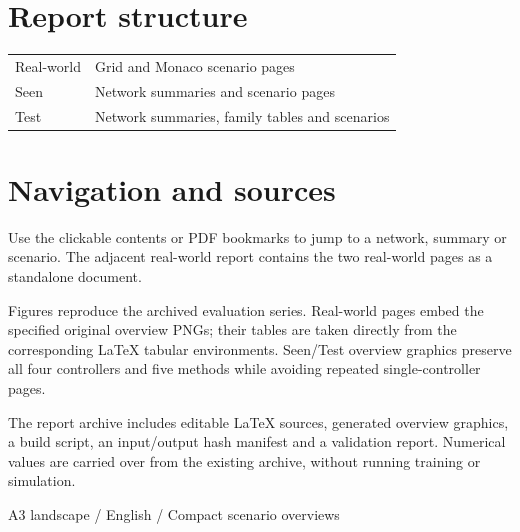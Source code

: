 \documentclass[11pt]{article}
\begin{document}
\begin{minipage}[t]{0.38\textwidth}
\section*{Report structure}
\begin{tabular}{ll}
Real-world & Grid and Monaco scenario pages\\
Seen & Network summaries and scenario pages\\
Test & Network summaries, family tables and scenarios
\end{tabular}
\section*{Navigation and sources}
Use the clickable contents or PDF bookmarks to jump to a network, summary or scenario.
The adjacent real-world report contains the two real-world pages as a standalone document.

Figures reproduce the archived evaluation series. Real-world pages embed the specified
original overview PNGs; their tables are taken directly from the corresponding LaTeX
tabular environments. Seen/Test overview graphics preserve all four controllers and
five methods while avoiding repeated single-controller pages.

The report archive includes editable LaTeX sources, generated overview graphics,
a build script, an input/output hash manifest and a validation report. Numerical values
are carried over from the existing archive, without running training or simulation.
\end{minipage}
\vfill{\small A3 landscape / English / Compact scenario overviews}
\end{document}
